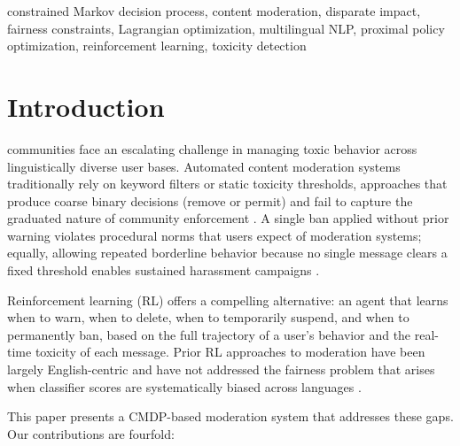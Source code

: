 \documentclass[journal]{IEEEtran}
\begin{document}
\begin{IEEEkeywords}
constrained Markov decision process, content moderation, disparate impact, fairness
constraints, Lagrangian optimization, multilingual NLP, proximal policy optimization,
reinforcement learning, toxicity detection
\end{IEEEkeywords}

\IEEEpeerreviewmaketitle


\section{Introduction}

 communities face an escalating challenge in managing toxic
behavior across linguistically diverse user bases. Automated content moderation systems
traditionally rely on keyword filters or static toxicity thresholds, approaches that
produce coarse binary decisions (remove or permit) and fail to capture the graduated
nature of community enforcement \cite{survey_moderation}. A single ban applied without
prior warning violates procedural norms that users expect of moderation systems; equally,
allowing repeated borderline behavior because no single message clears a fixed threshold
enables sustained harassment campaigns \cite{habib2019}.

Reinforcement learning (RL) offers a compelling alternative: an agent that learns when
to warn, when to delete, when to temporarily suspend, and when to permanently ban, based
on the full trajectory of a user's behavior and the real-time toxicity of each message.
Prior RL approaches to moderation have been largely English-centric \cite{rl_mod_survey}
and have not addressed the fairness problem that arises when classifier scores are
systematically biased across languages \cite{multilingual_bias}.

This paper presents a CMDP-based moderation system that addresses these gaps. Our
contributions are fourfold:
\end{document}

